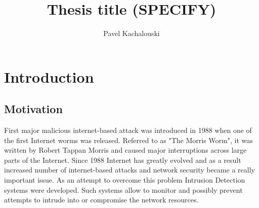\documentclass[thesis=M,english]{FITthesis}[2011/07/15]
\title{Thesis title (SPECIFY)}
\author{Pavel Kachalouski} %
\begin{document}

\chapter{Introduction}
\label{chap:introduction}
\section{Motivation}
First major malicious internet-based attack was introduced in 1988 when one of the first Internet worms was released. Referred to as "The Morris Worm", it was written by Robert Tappan Morris and caused major interruptions across large parts of the Internet. Since 1988 Internet has greatly evolved and as a result increased number of internet-based attacks and network security became a really important issue. As an attempt to overcome this problem Intrusion Detection systems were developed. Such systems allow to monitor and possibly prevent attempts to intrude into or compromise the network resources.
\end{document}
